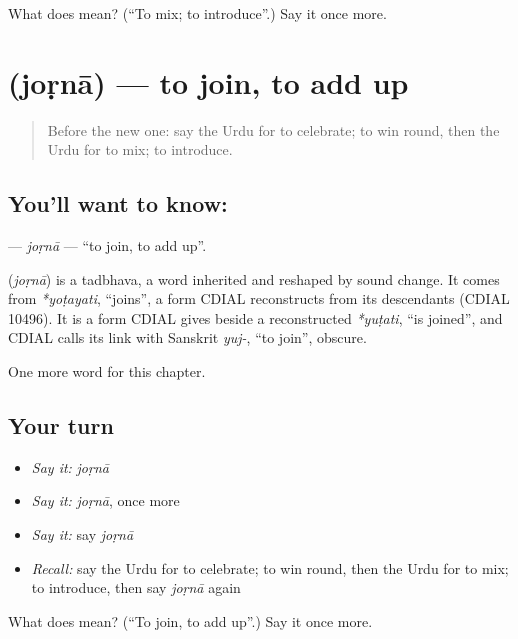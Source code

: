 \begin{tcolorbox}[breakable,colback=teal!4,colframe=teal!35!black,title={Before you move on}]
What does  mean? (\textquotedblleft{}To mix; to introduce\textquotedblright{}.) Say it once more.
\end{tcolorbox}
\section[\texorpdfstring{\ur{جوڑنا} (joṛnā)}{جوڑنا (joṛnā)}]{ (joṛnā) — to join, to add up}

\label{lesson:UR-C180-jorna}



\begin{quote}
Before the new one: say the Urdu for to celebrate; to win round, then the Urdu for to mix; to introduce.
\end{quote}

\subsection*{You'll want to know: }
\textbf{} — \emph{joṛnā} — \textquotedblleft{}to join, to add up\textquotedblright{}.

\begin{cousinweb}
\textbf{} (\emph{joṛnā}) is a tadbhava, a word inherited and reshaped by sound change. It comes from \emph{*yoṭayati}, \textquotedblleft{}joins\textquotedblright{}, a form CDIAL reconstructs from its descendants (CDIAL 10496). It is a form CDIAL gives beside a reconstructed \emph{*yuṭati}, \textquotedblleft{}is joined\textquotedblright{}, and CDIAL calls its link with Sanskrit \emph{yuj-}, \textquotedblleft{}to join\textquotedblright{}, obscure.
\end{cousinweb}

\begin{grammarlens}[title={What you've built}]
One more word for this chapter.
\end{grammarlens}

\subsection*{Your turn}
\begin{itemize}
\raggedright
  \item \emph{Say it:} \emph{joṛnā}
  \item \emph{Say it:} \emph{joṛnā}, once more
  \item \emph{Say it:} say \emph{joṛnā}
  \item \emph{Recall:} say the Urdu for to celebrate; to win round, then the Urdu for to mix; to introduce, then say \emph{joṛnā} again
\end{itemize}

\begin{tcolorbox}[breakable,colback=teal!4,colframe=teal!35!black,title={Before you move on}]
What does  mean? (\textquotedblleft{}To join, to add up\textquotedblright{}.) Say it once more.
\end{tcolorbox}
